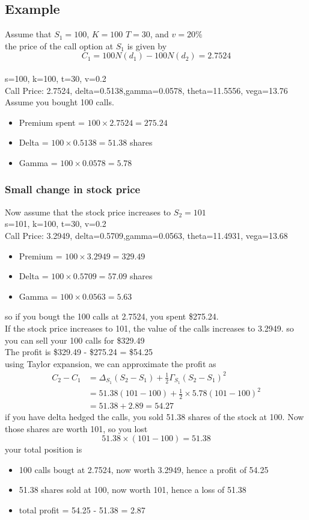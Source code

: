 \documentclass[12pt]{article}
\begin{document}
\newpage
\subsection{Example}
Assume that $S_1=100$, $K=100$ $T=30$, and $v=20\%$
\\the price of the call option at $S_1$ is given by
\[C_1 = 100N(d_1) - 100N(d_2)=2.7524\]
\\s=100, k=100, t=30, v=0.2
\\Call Price: 2.7524, delta=0.5138,gamma=0.0578, theta=11.5556, vega=13.76
\\ Assume you bought 100 calls.
\begin{itemize}
    \item Premium spent = $100\times 2.7524 = 275.24$
    \item Delta = $100\times 0.5138 = 51.38$ shares
    \item Gamma = $100\times 0.0578 = 5.78$
\end{itemize}
\subsubsection*{Small change in stock price}
Now assume that the stock price increases to $S_2=101$
\\s=101, k=100, t=30, v=0.2
\\Call Price: 3.2949, delta=0.5709,gamma=0.0563, theta=11.4931, vega=13.68
\begin{itemize}
    \item Premium = $100\times 3.2949 = 329.49$
    \item Delta = $100\times 0.5709 = 57.09$ shares
    \item Gamma = $100\times 0.0563 = 5.63$
\end{itemize}
so if you bougt the 100 calls at 2.7524, you spent \$275.24.
\\If the stock price increases to 101, the value of the calls increases to 3.2949. so you can sell your 100 calls for \$329.49
\\The profit is \$329.49 - \$275.24 = \$54.25
\\using Taylor expansion, we can approximate the profit as
\begin{equation}
\begin{aligned}
C_2 - C_1 &= \Delta_{S_1}(S_2-S_1) + \frac{1}{2}\Gamma_{S_1}(S_2-S_1)^2\\
&= 51.38(101-100) + \frac{1}{2}\times 5.78(101-100)^2\\
&= 51.38 + 2.89 = 54.27
\end{aligned}
\end{equation}
if you have delta hedged the calls, you sold 51.38 shares of the stock at 100. Now those shares are worth 101, so you lost
\[ 51.38\times(101-100) = 51.38\]
your total position is
\begin{itemize}
    \item 100 calls bougt at 2.7524, now worth 3.2949, hence a profit of 54.25
    \item 51.38 shares sold at 100, now worth 101, hence a loss of 51.38
    \item total profit = 54.25 - 51.38 = 2.87
\end{itemize}
\end{document}
